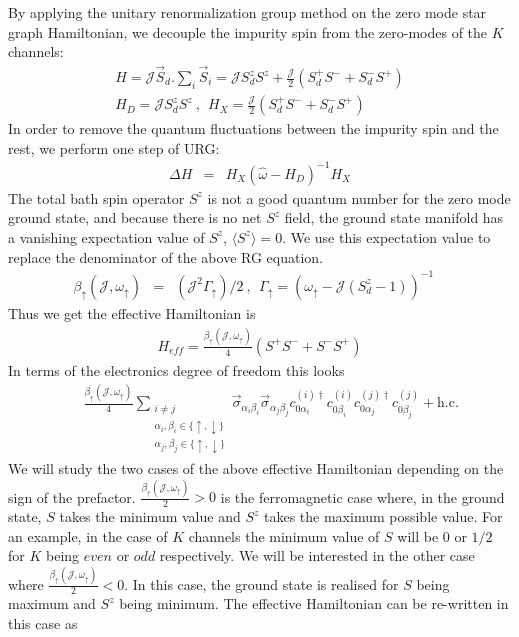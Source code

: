 \documentclass[reprint,prb,superscriptaddress]{revtex4-2}
\begin{document}
\noindent By applying the unitary renormalization group method on the zero mode star graph Hamiltonian, we decouple the impurity spin from the zero-modes of the $K$ channels: 
\begin{gather}
H = {\mathcal{J}} \vec{S}_d.\displaystyle\sum_i \vec{S}_i ={\mathcal{J}} S_d^zS^z + \frac{{\mathcal{J}}}{2} (S_d^+S^-+ S_d^-S^+) \nonumber\\
H_D = {\mathcal{J}} S^z_d S^z~,~~ H_X = \frac{{\mathcal{J}}}{2} (S_d^+S^-+ S_d^-S^+)
\end{gather}
In order to remove the quantum fluctuations between the impurity spin and the rest, we perform one step of URG:
\begin{eqnarray}
\Delta H &=& H_X ({\hat{\omega}-H_D})^{-1} H_X 
\end{eqnarray}
The total bath spin operator \(S^z\) is not a good quantum number for the zero mode ground state, and because there is no net $S^z$ field, the ground state manifold has a vanishing expectation value of $S^z$, $\langle S^z \rangle=0$. We use this expectation value to replace the denominator of the above RG equation.
\begin{eqnarray}
\beta_{\uparrow} ({\mathcal{J}},\omega_{\uparrow})&=& ({\mathcal{J}}^2 \Gamma_{\uparrow})/2 ~,~~\Gamma_{\uparrow}=(\omega_{\uparrow}-{\mathcal{J}}(S_d^z-1))^{-1}~~~~
\end{eqnarray}
Thus we get the effective Hamiltonian is 
\begin{eqnarray}
H_{eff} 
 =\frac{\beta_{\uparrow}({\mathcal{J}},\omega_{\uparrow})}{4} (S^+S^-+S^-S^+)   
\end{eqnarray}
In terms of the electronics degree of freedom this looks 
\begin{eqnarray}
&& \frac{ \beta_{\uparrow}({\mathcal{J}},\omega_{\uparrow}) }{4}   \displaystyle\sum_{\substack{i\neq j \\ \alpha_i,\beta_i\in \{\uparrow,\downarrow\}\\ \alpha_j,\beta_j\in \{\uparrow,\downarrow\}}}\vec{\sigma}_{\alpha_i\beta_i}\vec{\sigma}_{\alpha_j\beta_j}  c_{0\alpha_i}^{(i)\dagger}  c_{0\beta_i}^{(i)}    c_{0\alpha_j}^{(j)\dagger}  c_{0\beta_j}^{(j)} +\textrm{h.c.}   \nonumber
\label{eq:all-to-all_1}
\end{eqnarray}
We will study the two cases of the above effective Hamiltonian depending on the sign of the prefactor. $\frac{\beta_{\uparrow}({\mathcal{J}},\omega_{\uparrow})}{2} >0$ is the ferromagnetic case where, in the ground state, $S$ takes the minimum value and $S^z$ takes the maximum possible value. For an example, in the case of $K$ channels the minimum value of $S$ will be $0$ or $1/2$ for $K$ being $even $ or $odd$ respectively.  We will be interested in the other case where $\frac{\beta_{\uparrow}({\mathcal{J}},\omega_{\uparrow})}{2} <0$. In this case, the ground state is realised for $S$ being maximum and $S^z$ being minimum. The effective Hamiltonian can be re-written in this case as
\end{document}
